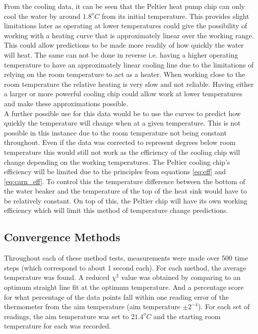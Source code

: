 \documentclass[10pt]{article}
\begin{document}
From the cooling data, it can be seen that the Peltier heat pump chip can only cool the water by around $1.8^oC$ from its initial temperature. This provides slight limitations later as operating at lower temperatures could give the possibility of working with a heating curve that is approximately linear over the working range. This could allow predictions to be made more readily of how quickly the water will heat. The same can not be done in reverse i.e. having a higher operating temperature to have an approximately linear cooling line due to the limitations of relying on the room temperature to act as a heater. When working close to the room temperature the relative heating is very slow and not reliable. Having either a larger or more powerful cooling chip could allow work at lower temperatures and make these approximations possible. \\

A further possible use for this data would be to use the curves to predict how quickly the temperature will change when at a given temperature. This is not possible in this instance due to the room temperature not being constant throughout. Even if the data was corrected to represent degrees below room temperature this would still not work as the efficiency of the cooling chip will change depending on the working temperatures. The Peltier cooling chip's efficiency will be limited due to the principles from equations \ref{eq:eff} and \ref{eq:carn_eff}. To control this the temperature difference between the bottom of the water beaker and the temperature of the top of the heat sink would have to be relatively constant. On top of this, the Peltier chip will have its own working efficiency which will limit this method of temperature change predictions.

\subsection*{Convergence Methods}
Throughout each of these method tests, measurements were made over 500 time steps (which correspond to about 1 second each). For each method, the average temperature was found. A reduced $\chi^2$ value was obtained by comparing to an optimum straight line fit at the optimum temperature. And a percentage score for what percentage of the data points fall within one reading error of the thermometer from the aim temperature (aim temperature $\pm 2^{-4}$). For each set of readings, the aim temperature was set to $21.4^oC$ and the starting room temperature for each was recorded.\\
\end{document}
